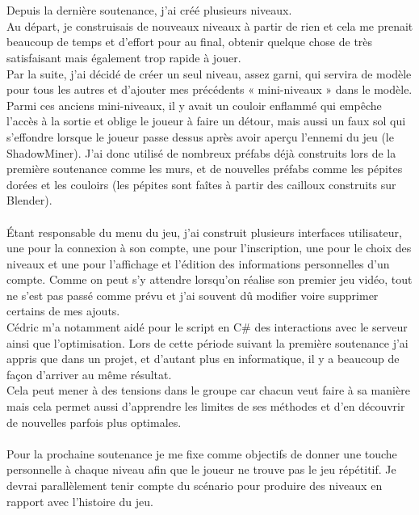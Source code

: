 \documentclass[titlepage, 13px, a4paper]{report}
\begin{document}
\paragraph{} \hspace{0pt} \\
Depuis la dernière soutenance, j'ai créé plusieurs niveaux. \\
Au départ, je construisais de nouveaux niveaux à partir de rien et cela me prenait beaucoup de temps et d'effort pour au final,  
obtenir quelque chose de très satisfaisant mais également trop rapide à jouer. \\
Par la suite, j'ai décidé de créer un seul niveau, 
assez garni, qui servira de modèle pour tous les autres et d'ajouter mes précédents « mini-niveaux » dans le modèle. 
Parmi ces anciens mini-niveaux, il y avait un couloir enflammé qui empêche l'accès à la sortie et oblige le joueur à faire un détour, 
mais aussi un faux sol qui s’effondre lorsque le joueur passe dessus après avoir aperçu l'ennemi du jeu (le ShadowMiner). J'ai donc 
utilisé de nombreux préfabs déjà construits lors de la première soutenance comme les murs, et de nouvelles préfabs 
comme les pépites dorées et les couloirs (les pépites sont faîtes à partir des cailloux construits sur Blender). \\ \\

Étant responsable du menu du jeu, j'ai construit plusieurs interfaces utilisateur, une pour la connexion à son compte, 
une pour l'inscription, une pour le choix des niveaux et une pour l'affichage et l’édition des informations personnelles d'un compte. 
Comme on peut s'y attendre lorsqu'on réalise son premier jeu vidéo, tout ne s'est pas passé comme prévu et j'ai souvent dû modifier 
voire supprimer certains de mes ajouts.  \\
Cédric m'a notamment aidé pour le script en C\# des interactions avec le serveur ainsi que l'optimisation. 
Lors de cette période suivant la première soutenance j'ai appris que dans un projet, et d'autant plus en informatique, 
il y a beaucoup de façon d'arriver au même résultat.  \\
Cela peut mener à des tensions dans le groupe car chacun veut faire à sa manière mais cela permet aussi d'apprendre les limites de ses méthodes 
et d’en découvrir de nouvelles parfois plus optimales. \\ \\

Pour la prochaine soutenance je me fixe comme objectifs de donner
une touche personnelle à chaque niveau afin que le joueur ne trouve pas le jeu répétitif. Je devrai parallèlement tenir compte 
du scénario pour produire des niveaux en rapport avec l'histoire du jeu.
\end{document}
